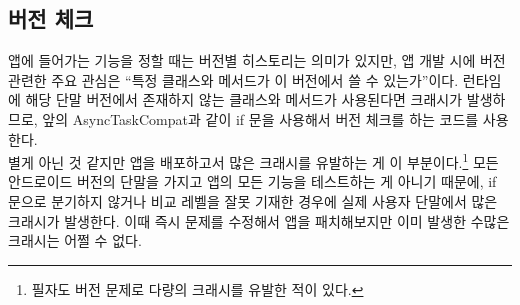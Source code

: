 \subsection{버전 체크}
앱에 들어가는 기능을 정할 때는 버전별 히스토리는 의미가 있지만, 앱 개발 시에 버전 관련한 주요 관심은 ``특정 클래스와 메서드가 이 버전에서 쓸 수 있는가''이다.
런타임에 해당 단말 버전에서 존재하지 않는 클래스와 메서드가 사용된다면 크래시가 발생하므로, 앞의 AsyncTaskCompat과 같이 if 문을 사용해서 버전 체크를 하는 코드를 사용한다.\\

별게 아닌 것 같지만 앱을 배포하고서 많은 크래시를 유발하는 게 이 부분이다.\footnote{필자도 버전 문제로 다량의 크래시를 유발한 적이 있다.}
모든 안드로이드 버전의 단말을 가지고 앱의 모든 기능을 테스트하는 게 아니기 때문에, if 문으로 분기하지 않거나 비교 레벨을 잘못 기재한 경우에 실제 사용자 단말에서 많은 크래시가 발생한다. 이때 즉시 문제를 수정해서 앱을 패치해보지만 이미 발생한 수많은 크래시는 어쩔 수 없다.\\

